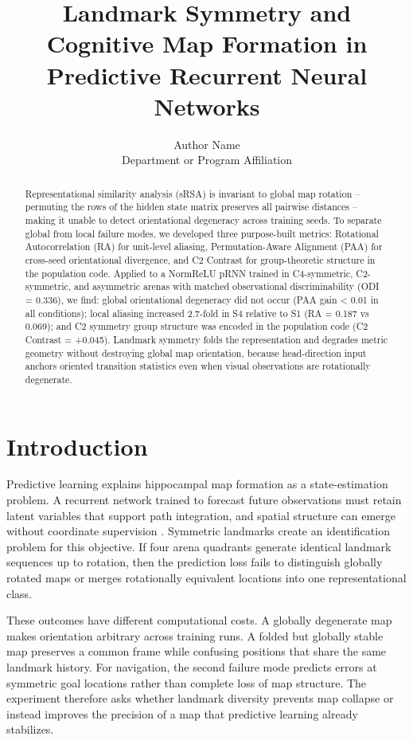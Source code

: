 ﻿\documentclass[10pt]{article}
\title{Landmark Symmetry and Cognitive Map Formation in Predictive Recurrent Neural Networks}
\author{Author Name\\Department or Program Affiliation}
\date{}
\begin{document}
\maketitle
\vspace{-1.2em}

\begin{abstract}
Representational similarity analysis (sRSA) is invariant to global map rotation -- permuting the rows of the hidden state matrix preserves all pairwise distances -- making it unable to detect orientational degeneracy across training seeds. To separate global from local failure modes, we developed three purpose-built metrics: Rotational Autocorrelation (RA) for unit-level aliasing, Permutation-Aware Alignment (PAA) for cross-seed orientational divergence, and C2 Contrast for group-theoretic structure in the population code. Applied to a NormReLU pRNN trained in C4-symmetric, C2-symmetric, and asymmetric arenas with matched observational discriminability (ODI = 0.336), we find: global orientational degeneracy did not occur (PAA gain < 0.01 in all conditions); local aliasing increased 2.7-fold in S4 relative to S1 (RA = 0.187 vs 0.069); and C2 symmetry group structure was encoded in the population code (C2 Contrast = +0.045). Landmark symmetry folds the representation and degrades metric geometry without destroying global map orientation, because head-direction input anchors oriented transition statistics even when visual observations are rotationally degenerate.
\end{abstract}

\section{Introduction}

Predictive learning explains hippocampal map formation as a state-estimation problem. A recurrent network trained to forecast future observations must retain latent variables that support path integration, and spatial structure can emerge without coordinate supervision \cite{levenstein2024}. Symmetric landmarks create an identification problem for this objective. If four arena quadrants generate identical landmark sequences up to rotation, then the prediction loss fails to distinguish globally rotated maps or merges rotationally equivalent locations into one representational class.

These outcomes have different computational costs. A globally degenerate map makes orientation arbitrary across training runs. A folded but globally stable map preserves a common frame while confusing positions that share the same landmark history. For navigation, the second failure mode predicts errors at symmetric goal locations rather than complete loss of map structure. The experiment therefore asks whether landmark diversity prevents map collapse or instead improves the precision of a map that predictive learning already stabilizes.
\end{document}
